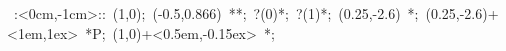 

\hbox{
\xy    <8cm,0cm>:<0cm,-1cm>::
       (1,0); (-0.5,0.866) **\dir{-}; ?(0)*\dir{<}; ?(1)*\dir{>};
       (0.25,-2.6) *{\bullet};
       (0.25,-2.6)+<1em,1ex> *{P};
       (1,0)+<0.5em,-0.15ex> *{\ell};
\endxy}

